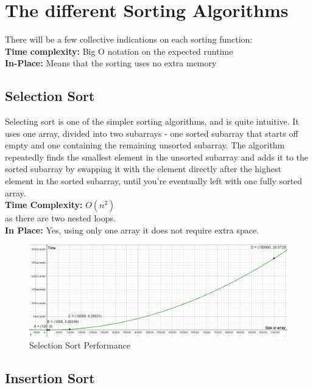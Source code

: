 \documentclass{article}
\begin{document}
	\newpage

\section{The different Sorting Algorithms}

There will be a few collective indications on each sorting function:
\\
\textbf{Time complexity:} Big O notation on the expected runtime 
\\
\textbf{In-Place:} Means that the sorting uses no extra memory


\subsection{Selection Sort}

Selecting sort is one of the simpler sorting algorithms, and is quite intuitive. It uses one array, divided into two subarrays - one sorted subarray that starts off empty and one containing the remaining unsorted subarray. The algorithm repeatedly finds the smallest element in the unsorted subarray and adds it to the sorted subarray by swapping it with the element directly after the highest element in the sorted subarray, until you're eventually left with one fully sorted array.
\\
\textbf{Time Complexity:} $O(n^{2})$ 
\\as there are two nested loops.
\\
\textbf{In Place:} Yes, using only one array it does not require extra space.

\begin{figure}[h]
	\centering
	\includegraphics[width=1\linewidth]{"images/Selection Sort"}
	\caption{Selection Sort Performance}
	\label{fig:selection-sort}
\end{figure}




\subsection{Insertion Sort}
\end{document}
